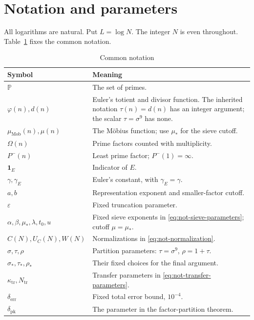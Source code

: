 \section{Notation and parameters}\label{sec:notation}

All logarithms are natural. Put \(L=\log N\).
The integer \(N\) is even throughout.
Table~\ref{tab:notation} fixes the common notation.

\begingroup
\small
\renewcommand{\arraystretch}{1.15}
\begin{longtable}{@{}p{.27\linewidth}p{.67\linewidth}@{}}
\caption{Common notation}\label{tab:notation}\\
\hline
Symbol & Meaning\\
\hline
\(\mathbb P\) & The set of primes.\\
\(\varphi(n),d(n)\) & Euler's totient and divisor function. The inherited notation \(\tau(n)=d(n)\) has an integer argument; the scalar \(\tau=\sigma^9\) has none.\\
\(\mu_{\mathrm{Mob}}(n),\mu(n)\) & The M\"obius function; use \(\mu_*\) for the sieve cutoff.\\
\(\Omega(n)\) & Prime factors counted with multiplicity.\\
\(P^-(n)\) & Least prime factor; \(P^-(1)=\infty\).\\
\(\mathbf1_E\) & Indicator of \(E\).\\
\(\gamma,\gamma_E\) & Euler's constant, with \(\gamma_E=\gamma\).\\
\(a,b\) & Representation exponent and smaller-factor cutoff.\\
\(\varepsilon\) & Fixed truncation parameter.\\
\(\alpha,\beta,\mu_*,\lambda,t_0,u\) & Fixed sieve exponents in \eqref{eq:not-sieve-parameters}; cutoff \(\mu=\mu_*\).\\
\(C(N),U_C(N),W(N)\) & Normalizations in \eqref{eq:not-normalization}.\\
\(\sigma,\tau,\rho\) & Partition parameters: \(\tau=\sigma^9\), \(\rho=1+\tau\).\\
\(\sigma_*,\tau_*,\rho_*\) & Their fixed choices for the final argument.\\
\(\kappa_{\mathrm{tr}},N_{\mathrm{tr}}\) & Transfer parameters in \eqref{eq:not-transfer-parameters}.\\
\(\delta_{\mathrm{err}}\) & Fixed total error bound, \(10^{-4}\).\\
\(\delta_{\mathrm{pk}}\) & The parameter in the factor-partition theorem.\\

\end{longtable}
